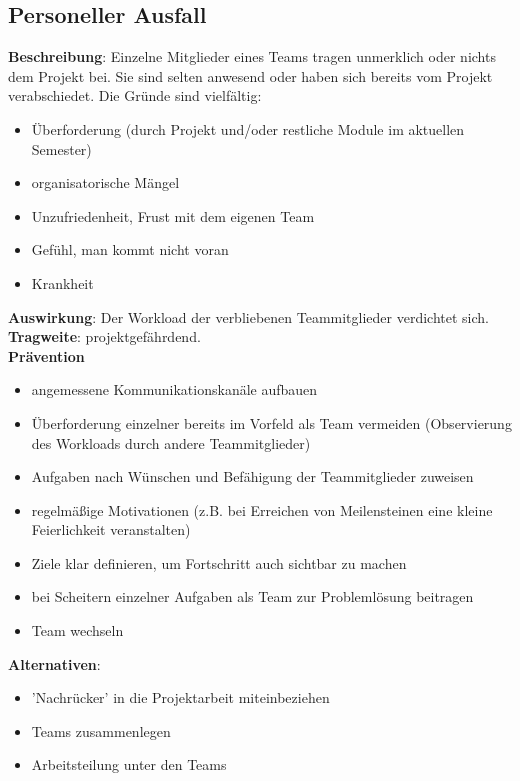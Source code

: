 \documentclass[a4paper, 12pt, titlepage]{scrartcl}
\begin{document}
	\subsection{Personeller Ausfall}
		\textbf{Beschreibung}: Einzelne Mitglieder eines Teams tragen unmerklich oder nichts dem Projekt bei. Sie sind selten anwesend oder haben sich bereits vom Projekt verabschiedet. Die Gr\"unde sind vielf\"altig:
			\begin{itemize}
				\item \"Uberforderung (durch Projekt und/oder restliche Module im aktuellen Semester)
				\item organisatorische M\"angel
				\item Unzufriedenheit, Frust mit dem eigenen Team
				\item Gef\"uhl, man kommt nicht voran
				\item Krankheit
			\end{itemize}
		\textbf{Auswirkung}: Der Workload der verbliebenen Teammitglieder verdichtet sich. \\
		\textbf{Tragweite}: projektgef\"ahrdend.\\
		\textbf{Pr\"avention}
			\begin{itemize}
				\item angemessene Kommunikationskan\"ale aufbauen
				\item \"Uberforderung einzelner bereits im Vorfeld als Team vermeiden (Observierung des Workloads durch andere Teammitglieder)
				\item Aufgaben nach W\"unschen und Bef\"ahigung der Teammitglieder zuweisen
				\item regelm\"a\ss ige Motivationen (z.B. bei Erreichen von Meilensteinen eine kleine Feierlichkeit veranstalten)
				\item Ziele klar definieren, um Fortschritt auch sichtbar zu machen
				\item bei Scheitern einzelner Aufgaben als Team zur Probleml\"osung beitragen
				\item Team wechseln
			\end{itemize}
		\textbf{Alternativen}:
			\begin{itemize}
				\item 'Nachr\"ucker' in die Projektarbeit miteinbeziehen
				\item Teams zusammenlegen
				\item Arbeitsteilung unter den Teams
			\end{itemize} 
		
\end{document}
